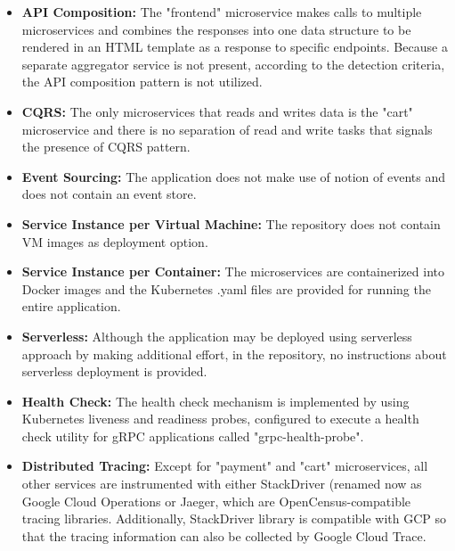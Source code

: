 \documentclass{Configuration_Files/PoliMi3i_thesis}
\begin{document}
\begin{itemize}
    \item \textbf{API Composition:} The "frontend" microservice makes calls to multiple microservices and combines the responses into one data structure to be rendered in an HTML template as a response to specific endpoints.
    Because a separate aggregator service is not present, according to the detection criteria, the API composition pattern is not utilized.
    
    \item \textbf{CQRS:} The only microservices that reads and writes data is the "cart" microservice and there is no separation of read and write tasks that signals the presence of CQRS pattern.
    
    \item \textbf{Event Sourcing:} The application does not make use of notion of events and does not contain an event store.
    
    \item \textbf{Service Instance per Virtual Machine:} The repository does not contain VM images as deployment option.
    
    \item \textbf{Service Instance per Container:} The microservices are containerized into Docker images and the Kubernetes .yaml files are provided for running the entire application.
    
    \item \textbf{Serverless:} Although the application may be deployed using serverless approach by making additional effort, in the repository, no instructions about serverless deployment is provided.
    
    \item \textbf{Health Check:} The health check mechanism is implemented by using Kubernetes liveness and readiness probes, configured to execute a health check utility for gRPC applications called "grpc-health-probe"\footnotemark[73].
    
    \item \textbf{Distributed Tracing:} Except for "payment" and "cart" microservices, all other services are instrumented with either StackDriver (renamed now as Google Cloud Operations\footnotemark[74] or Jaeger, which are OpenCensus-compatible tracing libraries.
    Additionally, StackDriver library is compatible with GCP so that the tracing information can also be collected by Google Cloud Trace\footnotemark[75].
    

\end{itemize}
\end{document}

